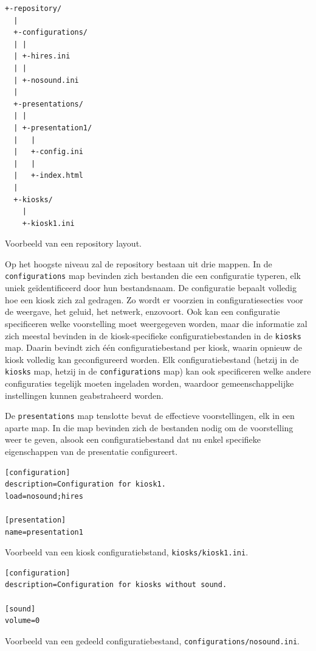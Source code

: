 \documentclass[verslag.tex]{subfiles}
\begin{document}
\begin{codefragment}
\begin{verbatim}
+-repository/
  |
  +-configurations/
  | |
  | +-hires.ini
  | |
  | +-nosound.ini
  |
  +-presentations/
  | |
  | +-presentation1/
  |   |
  |   +-config.ini
  |   |
  |   +-index.html
  |
  +-kiosks/
    |
    +-kiosk1.ini
\end{verbatim}
\caption{Voorbeeld van een repository layout.}
\end{codefragment}

Op het hoogste niveau zal de repository bestaan uit drie mappen. In de \texttt{configurations} map bevinden zich bestanden die een configuratie typeren, elk uniek geïdentificeerd door hun bestandsnaam. De configuratie bepaalt volledig hoe een kiosk zich zal gedragen. Zo wordt er voorzien in configuratiesecties voor de weergave, het geluid, het netwerk, enzovoort. Ook kan een configuratie specificeren welke voorstelling moet weergegeven worden, maar die informatie zal zich meestal bevinden in de kiosk-specifieke configuratiebestanden in de \texttt{kiosks} map. Daarin bevindt zich één configuratiebestand per kiosk, waarin opnieuw de kiosk volledig kan geconfigureerd worden. Elk configuratiebestand (hetzij in de \texttt{kiosks} map, hetzij in de \texttt{configurations} map) kan ook specificeren welke andere configuraties tegelijk moeten ingeladen worden, waardoor gemeenschappelijke instellingen kunnen geabstraheerd worden.

De \texttt{presentations} map tenslotte bevat de effectieve voorstellingen, elk in een aparte map. In die map bevinden zich de bestanden nodig om de voorstelling weer te geven, alsook een configuratiebestand dat nu enkel specifieke eigenschappen van de presentatie configureert.

\begin{codefragment}
\begin{verbatim}
[configuration]
description=Configuration for kiosk1.
load=nosound;hires

[presentation]
name=presentation1
\end{verbatim}
\caption{Voorbeeld van een kiosk configuratiebstand, \texttt{kiosks/kiosk1.ini}.}
\end{codefragment}

\begin{codefragment}
\begin{verbatim}
[configuration]
description=Configuration for kiosks without sound.

[sound]
volume=0
\end{verbatim}
\caption{Voorbeeld van een gedeeld configuratiebestand, \texttt{configurations/nosound.ini}.}
\end{codefragment}
\end{document}
